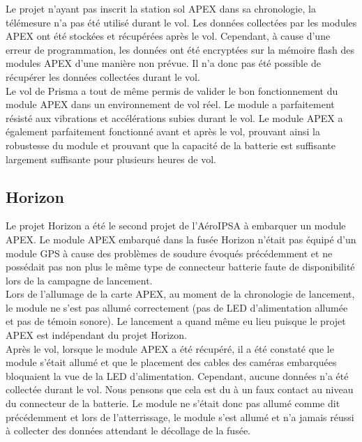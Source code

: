 \documentclass{article}
\newlength{\larg}
\begin{document}
Le projet n'ayant pas inscrit la station sol APEX dans sa chronologie, la télémesure n'a pas
été utilisé durant le vol. Les données collectées par les modules APEX ont été stockées
et récupérées après le vol. Cependant, à cause d'une erreur de programmation, les données
ont été encryptées sur la mémoire flash des modules APEX d'une manière non prévue. Il n'a
donc pas été possible de récupérer les données collectées durant le vol.\\

Le vol de Prisma a tout de même permis de valider le bon fonctionnement du module APEX
dans un environnement de vol réel. Le module a parfaitement résisté aux vibrations et
accélérations subies durant le vol. Le module APEX a également parfaitement fonctionné
avant et après le vol, prouvant ainsi la robustesse du module et prouvant que la capacité
de la batterie est suffisante largement suffisante pour plusieurs heures de vol.

\subsection{Horizon}

Le projet Horizon a été le second projet de l'AéroIPSA à embarquer un module APEX. Le
module APEX embarqué dans la fusée Horizon n'était pas équipé d'un module GPS à cause
des problèmes de soudure évoqués précédemment et ne possédait pas non plus le même
type de connecteur batterie faute de disponibilité lors de la campagne de lancement.\\

Lors de l'allumage de la carte APEX, au moment de la chronologie de lancement, le module
ne s'est pas allumé correctement (pas de LED d'alimentation allumée et pas de témoin sonore).
Le lancement a quand même eu lieu puisque le projet APEX est indépendant du projet Horizon.\\

Après le vol, lorsque le module APEX a été récupéré, il a été constaté que le module s'était
allumé et que le placement des cables des caméras embarquées bloquaient la vue de la LED
d'alimentation. Cependant, aucune données n'a été collectée durant le vol. Nous pensons que
cela est du à un faux contact au niveau du connecteur de la batterie. Le module ne s'était
donc pas allumé comme dit précédemment et lors de l'atterrissage, le module s'est allumé et
n'a jamais réussi à collecter des données attendant le décollage de la fusée.\\
\end{document}
